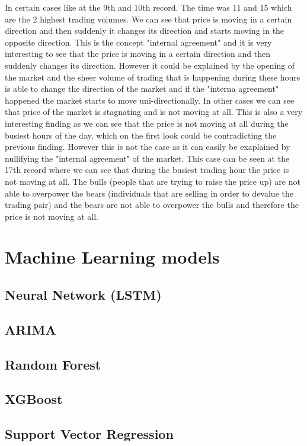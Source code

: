 \documentclass{imc-inf}
\begin{document}
			In certain cases like at the 9th and 10th record. The time was 11 and 15 which are the 2 highest trading volumes. We can see that price is moving in a certain direction and then suddenly it changes its direction and starts moving in the opposite direction.
			This is the concept "internal agreement" and it is very interesting to see that the price is moving in a certain direction and then suddenly changes its direction. However it could be 
			explained by the opening of the market and the sheer volume of trading that is happening during these hours is able to change the direction of the market and if the "interna agreement" happened
			the market starts to move uni-directionally.
			In other cases we can
			see that price of the market is stagnating and is not moving at all. This is also a very interesting finding as we can see that the price is not moving at all during the busiest hours of the day, which 
			on the first look could be contradicting the previous finding. However this is not the case as it can easily be exaplained by nullifying the "internal agreement" of the market.
			This case can be seen at the 17th record where we can see that during the busiest trading hour the price is not moving at all.
			The bulls (people that are trying to raise the price up) are not able to overpower the bears (individuals that are selling in order to devalue the trading pair) and the bears are not able to overpower the bulls and therefore the price is not moving at all. 
			

	\section{Machine Learning models}
		\subsection{Neural Network (LSTM)} 
		\subsection{ARIMA}
		\subsection{Random Forest}
		\subsection{XGBoost}
		\subsection{Support Vector Regression}
\end{document}
